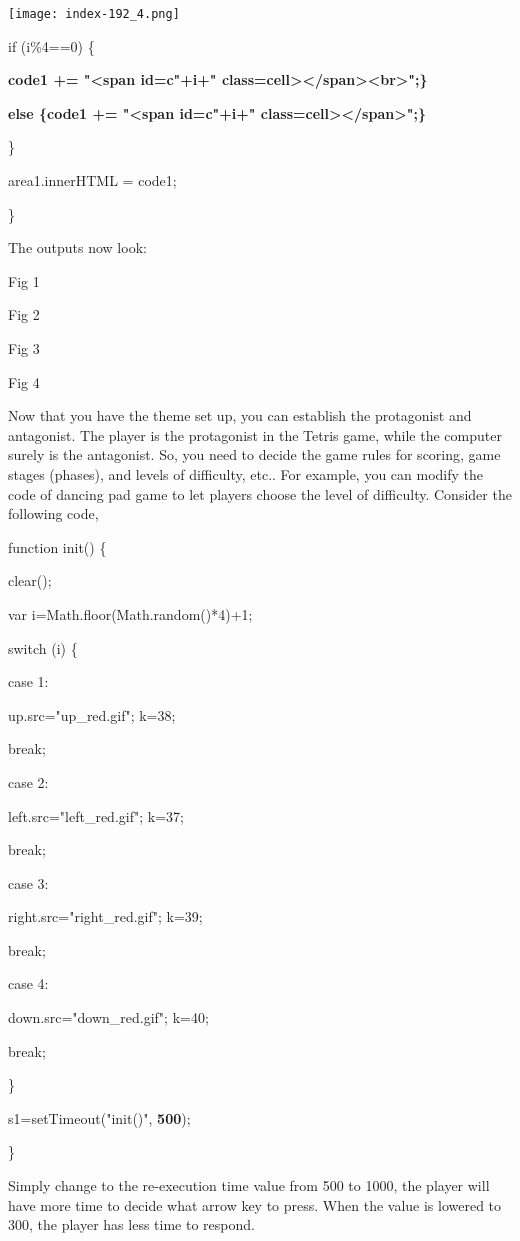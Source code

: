 \documentclass[
]{article}
\begin{document}
\texttt{[image: index-192\_4.png]}

if (i\%4==0) \{

\textbf{code1 += "\textless span id=c"+i+"
class=\textquotesingle cell\textquotesingle\textgreater\textless/span\textgreater\textless br\textgreater";\}}

\textbf{else \{code1 += "\textless span id=c"+i+"
class=\textquotesingle cell\textquotesingle\textgreater\textless/span\textgreater";\}}

\}

area1.innerHTML = code1;

\}

The outputs now look:

Fig 1

Fig 2

Fig 3

Fig 4

Now that you have the theme set up, you can establish the protagonist
and antagonist. The player is the protagonist in the Tetris game, while
the computer surely is the antagonist. So, you need to decide the game
rules for scoring, game stages (phases), and levels of difficulty, etc..
For example, you can modify the code of dancing pad game to let players
choose the level of difficulty. Consider the following code,

function init() \{

clear();

var i=Math.floor(Math.random()*4)+1;

switch (i) \{

case 1:

up.src="up\_red.gif"; k=38;

break;

case 2:

left.src="left\_red.gif"; k=37;

break;

case 3:

right.src="right\_red.gif"; k=39;

break;

case 4:

down.src="down\_red.gif"; k=40;

break;

\}

s1=setTimeout("init()", \textbf{500});

\}

Simply change to the re-execution time value from 500 to 1000, the
player will have more time to decide what arrow key to press. When the
value is lowered to 300, the player has less time to respond.
\end{document}

